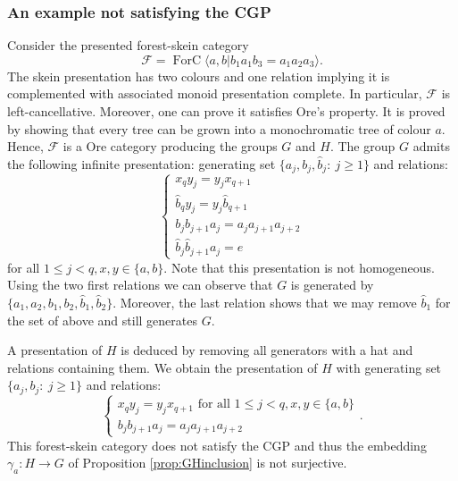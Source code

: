 \documentclass[a4paper, 12pt]{amsart}
\numberwithin{equation}{section}
\theoremstyle{definition}
\newcommand{\cF}{\mathcal F}
\DeclareMathOperator{\FC}{ForC}
\newcommand{\ga}{\gamma}
\newcommand{\la}{\langle}
\newcommand{\ra}{\rangle}
\begin{document}
\subsubsection{An example not satisfying the CGP}
Consider the presented forest-skein category
$$\cF=\FC\la a,b| b_1a_1b_3=a_1a_2a_3\ra.$$
The skein presentation has two colours and one relation implying it is complemented with associated monoid presentation complete.
In particular, $\cF$ is left-cancellative.
Moreover, one can prove it satisfies Ore's property. It is proved by showing that every tree can be grown into a monochromatic tree of colour $a$.
Hence, $\cF$ is a Ore category producing the groups $G$ and $H$.
The group $G$ admits the following infinite presentation: generating set $\{a_j,b_j,\hat b_j:\ j\geq 1\}$ and relations:
$$\begin{cases}
 x_{q} y_{j} = y_{j} x_{q+1} \\
\hat b_{q} y_{j} = y_{j} \hat b_{q+1} \\
b_j b_{j+1} a_j = a_j a_{j+1} a_{j+2}\\
\hat b_j \hat b_{j+1} a_j = e
\end{cases}$$
for all $1\leq j<q, x,y\in\{a,b\}$.
Note that this presentation is not homogeneous.
Using the two first relations we can observe that $G$ is generated by $\{a_1,a_2, b_1,b_2, \hat b_1,\hat b_2\}$.
Moreover, the last relation shows that we may remove $\hat b_1$ for the set of above and still generates $G$.

A presentation of $H$ is deduced by removing all generators with a hat and relations containing them.
We obtain the presentation of $H$ with generating set 
$\{a_j,b_j:\ j\geq 1\}$ and relations:
$$\begin{cases}
x_{q} y_{j} = y_{j} x_{q+1} \text{ for all } 1\leq j<q , x,y\in\{a,b\} \\
b_j b_{j+1} a_j = a_j a_{j+1} a_{j+2}
\end{cases}.$$
This forest-skein category does not satisfy the CGP and thus the embedding $\ga_a:H\to G$ of Proposition \ref{prop:GHinclusion} is not surjective.
\end{document}
